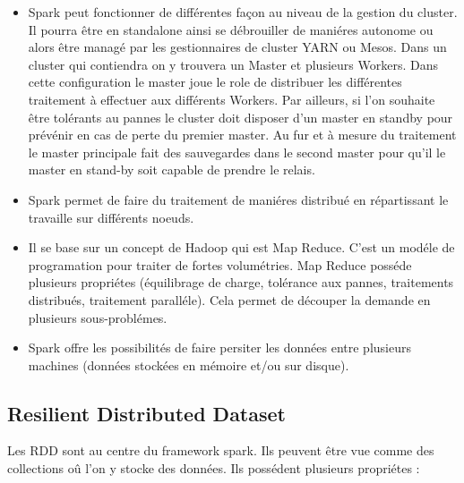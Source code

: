 \begin{itemize}
  \item Spark peut fonctionner de différentes façon au niveau de la gestion du cluster. Il pourra être en standalone ainsi se débrouiller de maniéres autonome ou alors être managé par les gestionnaires de cluster YARN ou Mesos. Dans un cluster qui contiendra on y trouvera un Master et plusieurs Workers. Dans cette configuration le master joue le role de distribuer les différentes traitement à effectuer aux différents Workers. Par ailleurs, si l'on souhaite être tolérants au pannes le cluster doit disposer d'un master en standby pour prévénir en cas de perte du premier master. Au fur et à mesure du traitement le master principale fait des sauvegardes dans le second master pour qu'il le master en stand-by soit capable de prendre le relais.
  \item Spark permet de faire du traitement de maniéres distribué en répartissant le travaille sur différents noeuds.
  \item Il se base sur un concept de Hadoop qui est Map Reduce. C'est un modéle de programation pour traiter de fortes volumétries. Map Reduce posséde plusieurs propriétes (équilibrage de charge, tolérance aux pannes, traitements distribués, traitement paralléle). Cela permet de découper la demande en plusieurs sous-problémes.
  \item Spark offre les possibilités de faire persiter les données entre plusieurs machines (données stockées en mémoire et/ou sur disque).
\end{itemize}

\subsection{Resilient Distributed Dataset}

Les RDD sont au centre du framework spark. Ils peuvent être vue comme des collections oû l'on y stocke des données. Ils possédent plusieurs propriétes :


